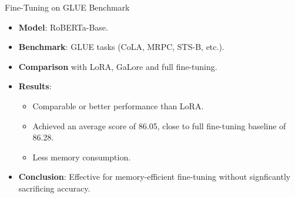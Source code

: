 \documentclass{beamer}
\begin{document}
\begin{frame}{Fine-Tuning on GLUE Benchmark}
    \begin{itemize}
        \item \textbf{Model}: RoBERTa-Base.
        \item \textbf{Benchmark}: GLUE tasks (CoLA, MRPC, STS-B, etc.).
        \item \textbf{Comparison} with LoRA, GaLore and full fine-tuning.
        \item \textbf{Results}:
            \begin{itemize}
                \item Comparable or better performance than LoRA.
                \item Achieved an average score of 86.05, close to full fine-tuning baseline of 86.28.
                \item Less memory consumption.
            \end{itemize}
        \item \textbf{Conclusion}: Effective for memory-efficient fine-tuning without signficantly sacrificing accuracy.
    \end{itemize}
\end{frame}
\end{document}

